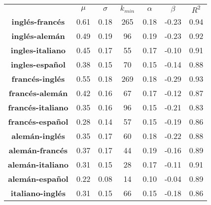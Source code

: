 \begin{table}[h!]
	\centering
	\begin{tabular}{ccccccc}
		\textbf{}                & \textbf{$\mu$} & \textbf{$\sigma$} & \textbf{$k_{min}$} & \textbf{$\alpha$} & \textbf{$\beta$} & \textbf{$R^{2}$} \\
		\textbf{inglés-francés}  & 0.61           & 0.18                & 265                   & 0.18           & -0.23         & 0.94        \\
		\textbf{inglés-alemán}   & 0.49           & 0.19                & 96                    & 0.19           & -0.23         & 0.92        \\
		\textbf{ingles-italiano} & 0.45           & 0.17                & 55                    & 0.17           & -0.10         & 0.91        \\
		\textbf{ingles-español}  & 0.38           & 0.15                & 70                    & 0.15           & -0.14         & 0.88        \\
		\textbf{francés-inglés}  & 0.55           & 0.18                & 269                   & 0.18           & -0.29         & 0.93        \\
		\textbf{francés-alemán}   & 0.42           & 0.16                & 67                    & 0.17           & -0.12         & 0.87        \\
		\textbf{francés-italiano} & 0.35           & 0.16                & 96                    & 0.15           & -0.21         & 0.83        \\
		\textbf{francés-español}  & 0.28           & 0.14                & 57                    & 0.15           & -0.19         & 0.86        \\
		\textbf{alemán-inglés}  & 0.35             & 0.17                & 60                    & 0.18           & -0.22         & 0.88        \\
		\textbf{alemán-francés}   & 0.37           & 0.17                & 44                    & 0.19           & -0.16         & 0.89        \\
		\textbf{alemán-italiano} & 0.31            & 0.15                & 28                    & 0.17           & -0.11         & 0.91        \\
		\textbf{alemán-español}  & 0.22            & 0.08                & 14                    & 0.10           & -0.04         & 0.89        \\
		\textbf{italiano-inglés} & 0.31          & 0.15                & 66                   & 0.15           & -0.18        & 0.86        \\

\end{tabular}
\end{table}
